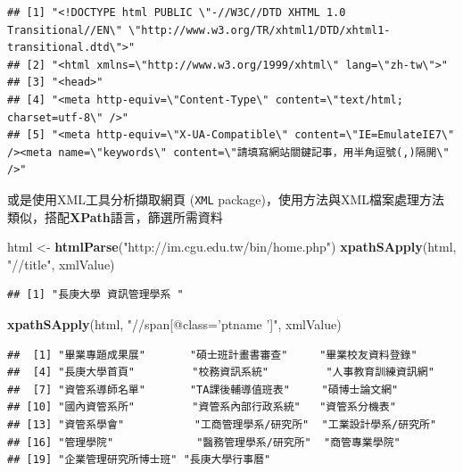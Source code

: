 \documentclass[]{book}
\newenvironment{Shaded}{\begin{snugshade}}{\end{snugshade}}
\newcommand{\KeywordTok}[1]{\textcolor[rgb]{0.13,0.29,0.53}{\textbf{{#1}}}}
\newcommand{\StringTok}[1]{\textcolor[rgb]{0.31,0.60,0.02}{{#1}}}
\newcommand{\NormalTok}[1]{{#1}}
\theoremstyle{definition}
\theoremstyle{definition}
\theoremstyle{remark}
\begin{document}
\begin{verbatim}
## [1] "<!DOCTYPE html PUBLIC \"-//W3C//DTD XHTML 1.0 Transitional//EN\" \"http://www.w3.org/TR/xhtml1/DTD/xhtml1-transitional.dtd\">"                
## [2] "<html xmlns=\"http://www.w3.org/1999/xhtml\" lang=\"zh-tw\">"                                                                                 
## [3] "<head>"                                                                                                                                       
## [4] "<meta http-equiv=\"Content-Type\" content=\"text/html; charset=utf-8\" />"                                                                    
## [5] "<meta http-equiv=\"X-UA-Compatible\" content=\"IE=EmulateIE7\" /><meta name=\"keywords\" content=\"請填寫網站關鍵記事，用半角逗號(,)隔開\" />"
\end{verbatim}

或是使用XML工具分析擷取網頁 (\texttt{XML}
package)，使用方法與XML檔案處理方法類似，搭配\textbf{XPath}語言，篩選所需資料

\begin{Shaded}
\begin{Highlighting}[]
\NormalTok{html <-}\StringTok{ }\KeywordTok{htmlParse}\NormalTok{(}\StringTok{"http://im.cgu.edu.tw/bin/home.php"}\NormalTok{)}
\KeywordTok{xpathSApply}\NormalTok{(html, }\StringTok{"//title"}\NormalTok{, xmlValue)}
\end{Highlighting}
\end{Shaded}

\begin{verbatim}
## [1] "長庚大學 資訊管理學系 "
\end{verbatim}

\begin{Shaded}
\begin{Highlighting}[]
\KeywordTok{xpathSApply}\NormalTok{(html, }\StringTok{"//span[@class='ptname ']"}\NormalTok{, xmlValue)}
\end{Highlighting}
\end{Shaded}

\begin{verbatim}
##  [1] "畢業專題成果展"       "碩士班計畫書審查"     "畢業校友資料登錄"    
##  [4] "長庚大學首頁"         "校務資訊系統"         "人事教育訓練資訊網"  
##  [7] "資管系導師名單"       "TA課後輔導值班表"     "碩博士論文網"        
## [10] "國內資管系所"         "資管系內部行政系統"   "資管系分機表"        
## [13] "資管系學會"           "工商管理學系/研究所"  "工業設計學系/研究所" 
## [16] "管理學院"             "醫務管理學系/研究所"  "商管專業學院"        
## [19] "企業管理研究所博士班" "長庚大學行事曆"
\end{verbatim}
\end{document}
